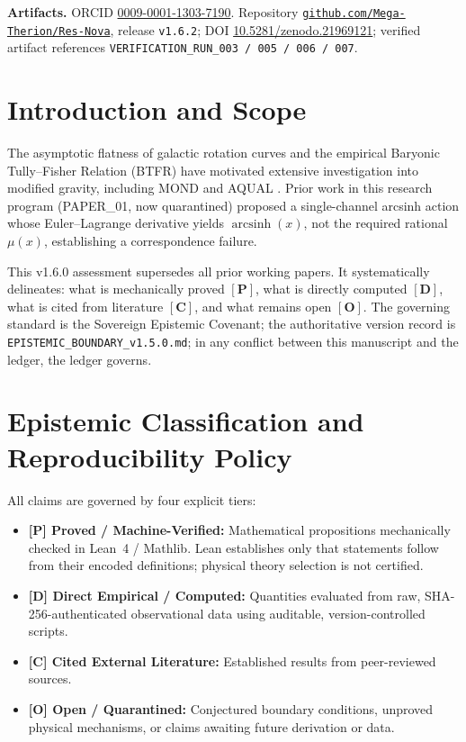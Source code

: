 \documentclass[aps,prd,preprint,superscriptaddress,nofootinbib,amsmath,amssymb,floatfix]{revtex4-2}
\begin{document}
\maketitle

\noindent\textbf{Artifacts.} ORCID \href{https://orcid.org/0009-0001-1303-7190}{0009-0001-1303-7190}. Repository \href{https://github.com/Mega-Therion/Res-Nova}{\texttt{github.com/Mega-Therion/Res-Nova}}, release \texttt{v1.6.2}; DOI \href{https://doi.org/10.5281/zenodo.21969121}{10.5281/zenodo.21969121}; verified artifact references \texttt{VERIFICATION\_RUN\_003 / 005 / 006 / 007}.

\section{Introduction and Scope}
\label{sec:intro}

The asymptotic flatness of galactic rotation curves and the empirical Baryonic Tully--Fisher Relation (BTFR) \cite{McGaugh2016} have motivated extensive investigation into modified gravity, including MOND \cite{Milgrom1983} and AQUAL \cite{Bekenstein1984}. Prior work in this research program (PAPER\_01, now quarantined) proposed a single-channel arcsinh action whose Euler--Lagrange derivative yields $\operatorname{arcsinh}(x)$, not the required rational $\mu(x)$, establishing a correspondence failure.

This v1.6.0 assessment supersedes all prior working papers. It systematically delineates: what is mechanically proved $\mathbf{[P]}$, what is directly computed $\mathbf{[D]}$, what is cited from literature $\mathbf{[C]}$, and what remains open $\mathbf{[O]}$. The governing standard is the Sovereign Epistemic Covenant; the authoritative version record is \texttt{EPISTEMIC\_BOUNDARY\_v1.5.0.md}; in any conflict between this manuscript and the ledger, the ledger governs.

\section{Epistemic Classification and Reproducibility Policy}
\label{sec:epistemic}

All claims are governed by four explicit tiers:
\begin{itemize}
    \item \textbf{[P] Proved / Machine-Verified:} Mathematical propositions mechanically checked in Lean~4 / Mathlib. Lean establishes only that statements follow from their encoded definitions; physical theory selection is not certified.
    \item \textbf{[D] Direct Empirical / Computed:} Quantities evaluated from raw, SHA-256-authenticated observational data using auditable, version-controlled scripts.
    \item \textbf{[C] Cited External Literature:} Established results from peer-reviewed sources.
    \item \textbf{[O] Open / Quarantined:} Conjectured boundary conditions, unproved physical mechanisms, or claims awaiting future derivation or data.
\end{itemize}
\end{document}
